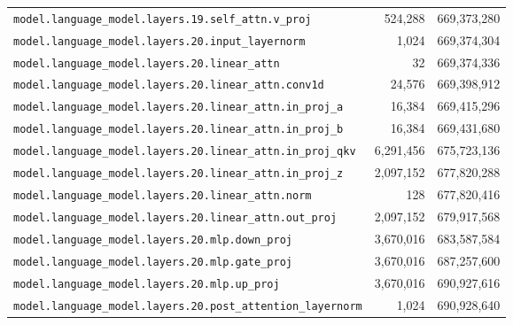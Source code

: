 \documentclass[10pt,a4paper]{article}
\theoremstyle{definition}
\begin{document}
\begin{appendices}
\begin{longtable}{p{9.5cm}rr}
\texttt{model.\allowbreak{}language\_model.\allowbreak{}layers.\allowbreak{}19.\allowbreak{}self\_attn.\allowbreak{}v\_proj} & 524,288 & 669,373,280 \\
\texttt{model.\allowbreak{}language\_model.\allowbreak{}layers.\allowbreak{}20.\allowbreak{}input\_layernorm} & 1,024 & 669,374,304 \\
\texttt{model.\allowbreak{}language\_model.\allowbreak{}layers.\allowbreak{}20.\allowbreak{}linear\_attn} & 32 & 669,374,336 \\
\texttt{model.\allowbreak{}language\_model.\allowbreak{}layers.\allowbreak{}20.\allowbreak{}linear\_attn.\allowbreak{}conv1d} & 24,576 & 669,398,912 \\
\texttt{model.\allowbreak{}language\_model.\allowbreak{}layers.\allowbreak{}20.\allowbreak{}linear\_attn.\allowbreak{}in\_proj\_a} & 16,384 & 669,415,296 \\
\texttt{model.\allowbreak{}language\_model.\allowbreak{}layers.\allowbreak{}20.\allowbreak{}linear\_attn.\allowbreak{}in\_proj\_b} & 16,384 & 669,431,680 \\
\texttt{model.\allowbreak{}language\_model.\allowbreak{}layers.\allowbreak{}20.\allowbreak{}linear\_attn.\allowbreak{}in\_proj\_qkv} & 6,291,456 & 675,723,136 \\
\texttt{model.\allowbreak{}language\_model.\allowbreak{}layers.\allowbreak{}20.\allowbreak{}linear\_attn.\allowbreak{}in\_proj\_z} & 2,097,152 & 677,820,288 \\
\texttt{model.\allowbreak{}language\_model.\allowbreak{}layers.\allowbreak{}20.\allowbreak{}linear\_attn.\allowbreak{}norm} & 128 & 677,820,416 \\
\texttt{model.\allowbreak{}language\_model.\allowbreak{}layers.\allowbreak{}20.\allowbreak{}linear\_attn.\allowbreak{}out\_proj} & 2,097,152 & 679,917,568 \\
\texttt{model.\allowbreak{}language\_model.\allowbreak{}layers.\allowbreak{}20.\allowbreak{}mlp.\allowbreak{}down\_proj} & 3,670,016 & 683,587,584 \\
\texttt{model.\allowbreak{}language\_model.\allowbreak{}layers.\allowbreak{}20.\allowbreak{}mlp.\allowbreak{}gate\_proj} & 3,670,016 & 687,257,600 \\
\texttt{model.\allowbreak{}language\_model.\allowbreak{}layers.\allowbreak{}20.\allowbreak{}mlp.\allowbreak{}up\_proj} & 3,670,016 & 690,927,616 \\
\texttt{model.\allowbreak{}language\_model.\allowbreak{}layers.\allowbreak{}20.\allowbreak{}post\_attention\_layernorm} & 1,024 & 690,928,640 \\

\end{longtable}
\end{appendices}
\end{document}
